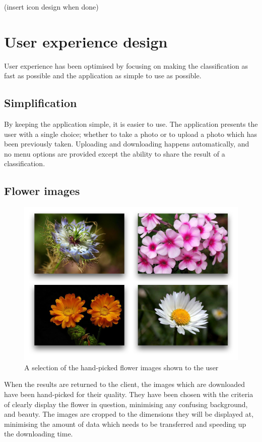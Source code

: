 \documentclass[11pt, a4paper]{report}
\begin{document}
(insert icon design when done)


\section{User experience design}

User experience has been optimised by focusing on making the classification as fast as possible and the application as simple to use as possible. 

\subsection{Simplification}

By keeping the application simple, it is easier to use. The application presents the user with a single choice; whether to take a photo or to upload a photo which has been previously taken. Uploading and downloading happens automatically, and no menu options are provided except the ability to share the result of a classification. 

\subsection{Flower images}

\begin{figure}[hbt]
	\centering
  \includegraphics[totalheight=8cm]{img/14.png}
  \caption{A selection of the hand-picked flower images shown to the user}
  \label{img:14}
\end{figure}

When the results are returned to the client, the images which are downloaded have been hand-picked for their quality. They have been chosen with the criteria of clearly display the flower in question, minimising any confusing background, and beauty. The images are cropped to the dimensions they will be displayed at, minimising the amount of data which needs to be transferred and speeding up the downloading time. 
\end{document}
